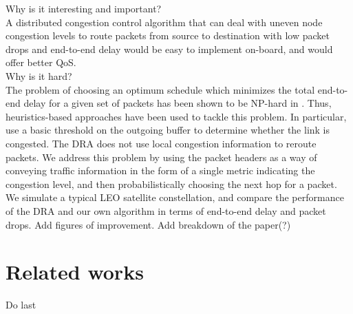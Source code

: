 \documentclass[10pt,conference, draftcls, letterpaper]{IEEEtran}
\newcommand{\rough}[1]{{\color{red} #1}}
\begin{document}
\rough{Why is it interesting and important?}\\
A distributed congestion control algorithm that can deal with uneven node congestion levels to route packets from source to destination with low packet drops and end-to-end delay would be easy to implement on-board, and would offer better QoS. \\
\rough{Why is it hard?}\\
The problem of choosing an optimum schedule which minimizes the total end-to-end delay for a given set of packets has been shown to be NP-hard in \cite{opt_schedule}. Thus, heuristics-based approaches have been used to tackle this problem. In particular, \cite{ekici-datagram}\cite{ekici-dist} use a basic threshold on the outgoing buffer to determine whether the link is congested. The DRA does not use local congestion information to reroute packets. We address this problem by using the packet headers as a way of conveying traffic information in the form of a single metric indicating the congestion level, and then probabilistically choosing the next hop for a packet. We simulate a typical LEO satellite constellation, and compare the performance of the DRA and our own algorithm in terms of end-to-end delay and packet drops. \rough{Add figures of improvement. Add breakdown of the paper(?)}
\section{Related works}
\rough{Do last}
\end{document}
